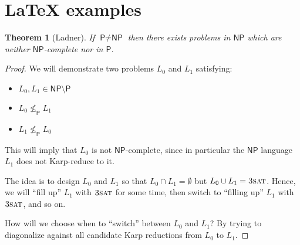 \documentclass[letterpaper,11pt]{article}
\newtheorem{theorem}{Theorem}
\newcommand{\cc}[1]{\ensuremath{\textsf{#1}}\xspace}
\renewcommand{\P}{\cc{P}}
\newcommand{\NP}{\cc{NP}}
\newcommand{\karp}{\le_{\textsf{P}}}
\newcommand{\prob}[1]{\ensuremath{\textsc{#1}}\xspace}
\newcommand{\ThreeSAT}{\prob{3sat}}
\newcounter{problem}
\begin{document}
\section*{LaTeX examples}

\begin{theorem}[Ladner]
    If $\P \ne \NP$ then there exists problems in $\NP$ which are neither \NP-complete nor in \P.
\end{theorem}
\begin{proof}
    We will demonstrate two problems $L_0$ and $L_1$ satisfying:
    \begin{itemize}
        \item $L_0, L_1 \in \NP \setminus \P$
        \item $L_0 \not\karp L_1$
        \item $L_1 \not\karp L_0$
    \end{itemize}
    This will imply that $L_0$ is not \NP-complete, since in particular the \NP language $L_1$ does not Karp-reduce to it.

The idea is to design $L_0$ and $L_1$ so that $L_0 \cap L_1 = \emptyset$ but $L_0 \cup L_1 = \ThreeSAT$. Hence, we will ``fill up'' $L_1$ with \ThreeSAT for some time, then switch to ``filling up'' $L_1$ with \ThreeSAT, and so on. 

How will we choose when to ``switch'' between $L_0$ and $L_1$? By trying to diagonalize against all candidate Karp reductions from $L_0$ to $L_1$. 


\end{proof}
\end{document}
